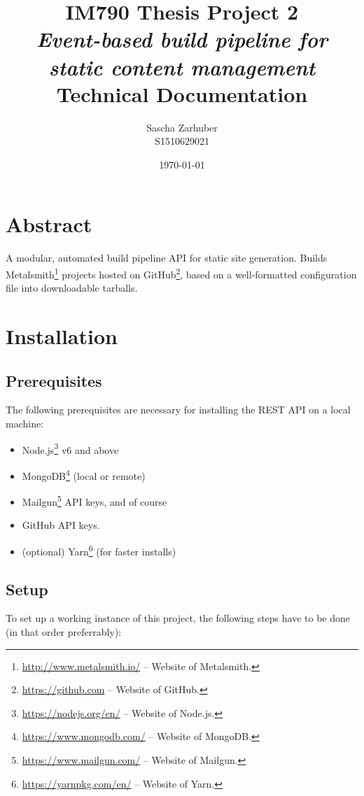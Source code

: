 \documentclass[a4paper,english,11pt]{report}
\author{Sascha Zarhuber\\ S1510629021}
\title{IM790 Thesis Project 2\\ \emph{Event-based build pipeline for static content management}\\ Technical Documentation}
\date{\today}
\begin{document}
\maketitle
\tableofcontents

\chapter*{Abstract} %

A modular, automated build pipeline API for static site generation.
Builds Metalsmith\footnote{\url{http://www.metalsmith.io/} -- Website of Metalsmith.} projects hosted on GitHub\footnote{\url{https://github.com} -- Website of GitHub.}, based on a well-formatted configuration file into downloadable tarballs.


\chapter{Installation}

\section{Prerequisites}
The following prerequisites are necessary for installing the REST API on a local machine:

\begin{itemize}
  \item Node.js\footnote{\url{https://nodejs.org/en/} -- Website of Node.js.} v6 and above
  \item MongoDB\footnote{\url{https://www.mongodb.com/} -- Website of MongoDB.} (local or remote)
  \item Mailgun\footnote{\url{https://www.mailgun.com/} -- Website of Mailgun.} API keys, and of course
  \item GitHub API keys.
  \item (optional) Yarn\footnote{\url{https://yarnpkg.com/en/} -- Website of Yarn.} (for faster installs)
\end{itemize}


\section{Setup}
To set up a working instance of this project, the following steps have to be done (in that order preferrably):
\end{document}
